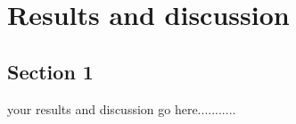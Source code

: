 \chapter{Results and discussion}  %

\section{Section 1} %

 

 

your results and discussion go here........... 